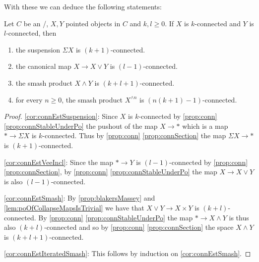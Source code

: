 With these we can deduce the following statements:
\begin{corollary}\label{cor:connEst}
    Let $C$ be an \inftytop/, $X,Y$ pointed objects in $C$ and $k,l\geq 0$. 
    If $X$ is $k$-connected and $Y$ is $l$-connected, then
    \begin{enumerate}[label={(\roman*)}]
        \item the suspension $\Sigma X$ is $(k+1)$-connected. \label{cor:connEstSuspension}
        \item the canonical map $X\to X\vee Y$ is $(l-1)$-connected. \label{cor:connEstVeeIncl}
        \item the smash product $X\wedge Y$ is $(k + l + 1)$-connected. \label{cor:connEstSmash}
        \item for every $n\geq 0$, the smash product $X^{\wedge n}$ is $(n(k+1)-1)$-connected. \label{cor:connEstIteratedSmash}
    \end{enumerate}
    \begin{proof}
        \ref{cor:connEstSuspension}: Since $X$ is $k$-connected by \cref{prop:conn} \ref{prop:connStableUnderPo} the pushout of the map $X\to *$ which is a map $*\to \Sigma X$ is $k$-connected.
        Thus by \cref{prop:conn} \ref{prop:connSection} the map $\Sigma X\to *$ is $(k+1)$-connected.

        \ref{cor:connEstVeeIncl}: Since the map $*\to Y$ is $(l-1)$-connected by \cref{prop:conn} \ref{prop:connSection}, by \cref{prop:conn} \ref{prop:connStableUnderPo} the map $X\to X\vee Y$ is also $(l-1)$-connected.
        
        \ref{cor:connEstSmash}: By \cref{prop:blakersMassey} and \cref{lem:poOfCollapseMapsIsTrivial} we have that $X\vee Y\to X\times Y$ is  $(k+l)$-connected. 
        By \cref{prop:conn} \ref{prop:connStableUnderPo} the map $*\to X\wedge Y$ is thus also $(k+l)$-connected and so by \cref{prop:conn} \ref{prop:connSection} the space $X\wedge Y$ is $(k+l+1)$-connected.

        \ref{cor:connEstIteratedSmash}: This follows by induction on \ref{cor:connEstSmash}.
    \end{proof}
\end{corollary}
